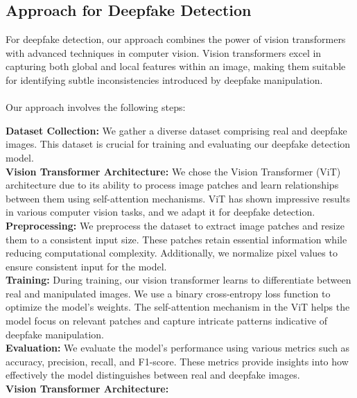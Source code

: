 \subsection{Approach for Deepfake Detection}

For deepfake detection, our approach combines the power of vision transformers with advanced techniques in computer vision. Vision transformers excel in capturing both global and local features within an image, making them suitable for identifying subtle inconsistencies introduced by deepfake manipulation.
\\
\\
Our approach involves the following steps:
\vspace{0.2cm}

\noindent\textbf{Dataset Collection:} We gather a diverse dataset comprising real and deepfake images. This dataset is crucial for training and evaluating our deepfake detection model.
\\

\noindent \textbf{Vision Transformer Architecture:} We chose the Vision Transformer (ViT) architecture due to its ability to process image patches and learn relationships between them using self-attention mechanisms. ViT has shown impressive results in various computer vision tasks, and we adapt it for deepfake detection.
\\

\noindent\textbf{Preprocessing:} We preprocess the dataset to extract image patches and resize them to a consistent input size. These patches retain essential information while reducing computational complexity. Additionally, we normalize pixel values to ensure consistent input for the model.
\\

\noindent\textbf{Training:} During training, our vision transformer learns to differentiate between real and manipulated images. We use a binary cross-entropy loss function to optimize the model's weights. The self-attention mechanism in the ViT helps the model focus on relevant patches and capture intricate patterns indicative of deepfake manipulation.
\\

\noindent\textbf{Evaluation:} We evaluate the model's performance using various metrics such as accuracy, precision, recall, and F1-score. These metrics provide insights into how effectively the model distinguishes between real and deepfake images.
\\
\newpage
\noindent\textbf{Vision Transformer Architecture:}

